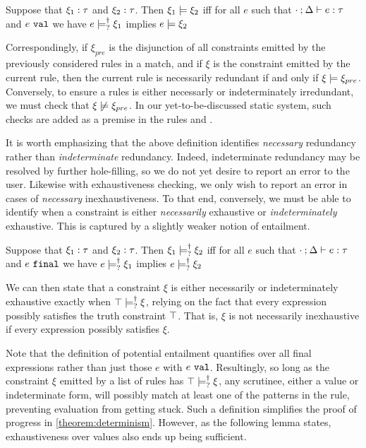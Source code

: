 \begin{definition}
	\label{definition:const-entailment}
	Suppose that $\xi_1 : \tau$ and $\xi_2 : \tau$.
	Then $\xi_1 \models \xi_2$ iff for all $e$ such that $\cdot \mathbin{;} \Delta \vdash e : \tau$ and $e ~\mathtt{val}$ we have $e \models_{?}^{\dag} \xi_1$ implies $e \models \xi_2$
\end{definition}
Correspondingly, if $\xi_{pre}$ is the disjunction of all constraints emitted by the previously considered rules in a match, and if $\xi$ is the constraint emitted by the current rule, then the current rule is necessarily redundant if and only if $\xi \models \xi_{pre}$. Conversely, to ensure a rules is either necessarly or indeterminately irredundant, we must check that $\cnotsatisfy{\xi}{\xi_{pre}}$. In our yet-to-be-discussed static system, such checks are added as a premise in the rules \TOneRules and \TRules.

It is worth emphasizing that the above definition identifies \emph{necessary} redundancy rather than \emph{indeterminate} redundancy. Indeed, indeterminate redundancy may be resolved by further hole-filling, so we do not yet desire to report an error to the user. Likewise with exhaustiveness checking, we only wish to report an error in cases of \emph{necessary} inexhaustiveness. To that end, conversely, we must be able to identify when a constraint is either \emph{necessarily} exhaustive or \emph{indeterminately} exhaustive. This is captured by a slightly weaker notion of entailment.

\begin{definition}
	\label{definition:nn-entailment}
	Suppose that $\xi_1 : \tau$ and $\xi_2 : \tau$. Then $\xi_1 \models_{?}^{\dag} \xi_2$ iff for all $e$ such that $\cdot \mathbin{;} \Delta \vdash e : \tau$ and $e ~\mathtt{final}$ we have $e \models_{?}^{\dag} \xi_1$ implies $e \models_{?}^{\dag} \xi_2$ 
\end{definition}
We can then state that a constraint $\xi$ is either necessarily or indeterminately exhaustive exactly when $\top \models_{?}^{\dag} \xi$, relying on the fact that every expression possibly satisfies the truth constraint $\top$. That is, $\xi$ is not necessarily inexhaustive if every expression possibly satisfies $\xi$. 

Note that the definition of potential entailment quantifies over all final expressions rather than just those $e$ with $e ~\mathtt{val}$. Resultingly, so long as the constraint $\xi$ emitted by a list of rules has $\top \models_{?}^{\dag} \xi$, any scrutinee, either a value or indeterminate form, will possibly match at least one of the patterns in the rule, preventing evaluation from getting stuck. Such a definition simplifies the proof of progress in \autoref{theorem:determinism}. However, as the following lemma states, exhaustiveness over values also ends up being sufficient.

